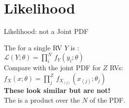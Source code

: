 \documentclass[10pt,sans,english,compress,table,xcolor=dvipsnames]{beamer}
\begin{document}
% 
%
%
%




\section*{Likelihood}

\begin{frame}{Likelihood: not a Joint PDF}

The  for a single RV $Y$ is :\\[1ex]
$\mathcal{L}(Y;\theta) = \prod\limits_i^N\, f_Y(y_i;\theta) $\\[1ex]%

Compare with the joint PDF for $Z$ RVs:\\[1ex]
$ f_{X} (x;\theta) = \prod\limits_j^Z\, f_{X_{(j)}} (x_{(j)};\theta_j ) $\\[1ex]%

\textbf{These look similar but are not!}\\[1ex]

The  is a product over the $N$  of the PDF. %

\end{frame}
\end{document}
